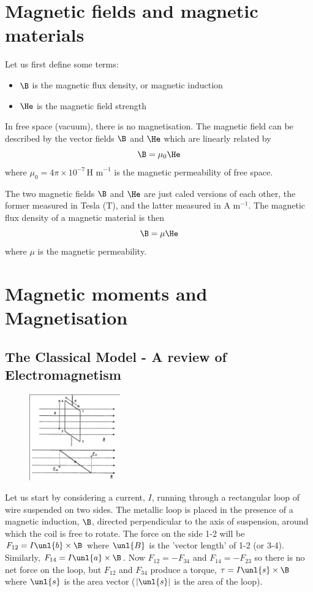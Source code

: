 \documentclass[a4paper, 11pt, normalem]{report}
\begin{document}
\section{Magnetic fields and magnetic materials}
Let us first define some terms:
\begin{itemize}
    \item $\B$ is the magnetic flux density, or magnetic induction
    \item $\He$ is the magnetic field strength
\end{itemize}
In free space (vacuum), there is no magnetisation. 
The magnetic field can be described by the vector fields $\B$ and $\He$ which are linearly related by 
\begin{equation}
    \B = \mu_0 \He
\end{equation}
where $\mu_0 = 4\pi\times10^{-7}\,\text{H m}^{-1}$ is the magnetic permeability of free space.

The two magnetic fields $\B$ and $\He$ are just caled versions of each other, the former measured in Tesla (T), and the latter measured in A m$^{-1}$.
The magnetic flux density of a magnetic material is then 
\begin{equation}
    \B = \mu \He
\end{equation}
where $\mu$ is the magnetic permeability. 

\section{Magnetic moments and Magnetisation}
\subsection{The Classical Model - A review of Electromagnetism}
\begin{figure}
    \centering
    \includegraphics[width=0.35\textwidth]{induct.png}
\end{figure}
Let us start by considering a current, $I$, running through a rectangular loop of wire suspended on two sides. 
The metallic loop is placed in the presence of a magnetic induction, $\B$, directed perpendicular to the axis of suspension, around which the coil is free to rotate. 
The force on the side 1-2 will be $F_{12} = I\unl{b}\times\B$ where $\unl{B}$ is the 'vector length' of 1-2 (or 3-4). 
Similarly, $F_{14} = I\unl{a}\times\B$.
Now $F_{12} = -F_{34}$ and $F_{14} = -F_{23}$ so there is no net force on the loop, but $F_{12}$ and $F_{34}$ produce a torque, $\tau = I\unl{s}\times\B$ where $\unl{s}$ is the area vector ($|\unl{s}|$ is the area of the loop).
\end{document}
